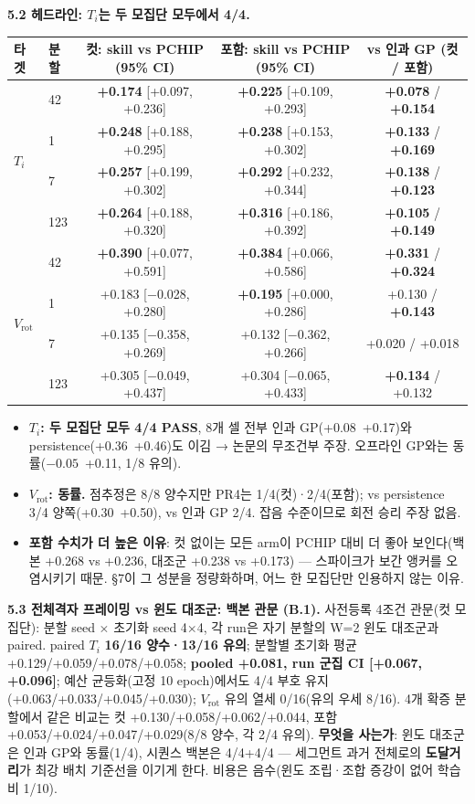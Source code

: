 \documentclass[10pt,a4paper]{article}
\newcommand{\Ti}{\ensuremath{T_i}}
\newcommand{\Vrot}{\ensuremath{V_\mathrm{rot}}}
\newcommand{\pass}[1]{\textbf{#1}}
\begin{document}
\textbf{5.2 헤드라인: \Ti{}는 두 모집단 모두에서 4/4.}
\begin{center}\small
\begin{tabular}{llccc}\toprule
타겟 & 분할 & 컷: skill vs PCHIP (95\% CI) & 포함: skill vs PCHIP (95\% CI) & vs 인과 GP (컷 / 포함) \\ \midrule
\multirow{4}{*}{\Ti}
 & 42 & \pass{+0.174} [+0.097, +0.236] & \pass{+0.225} [+0.109, +0.293] & \pass{+0.078} / \pass{+0.154} \\
 & 1 & \pass{+0.248} [+0.188, +0.295] & \pass{+0.238} [+0.153, +0.302] & \pass{+0.133} / \pass{+0.169} \\
 & 7 & \pass{+0.257} [+0.199, +0.302] & \pass{+0.292} [+0.232, +0.344] & \pass{+0.138} / \pass{+0.123} \\
 & 123 & \pass{+0.264} [+0.188, +0.320] & \pass{+0.316} [+0.186, +0.392] & \pass{+0.105} / \pass{+0.149} \\ \midrule
\multirow{4}{*}{\Vrot}
 & 42 & \pass{+0.390} [+0.077, +0.591] & \pass{+0.384} [+0.066, +0.586] & \pass{+0.331} / \pass{+0.324} \\
 & 1 & +0.183 [$-$0.028, +0.280] & \pass{+0.195} [+0.000, +0.286] & +0.130 / \pass{+0.143} \\
 & 7 & +0.135 [$-$0.358, +0.269] & +0.132 [$-$0.362, +0.266] & +0.020 / +0.018 \\
 & 123 & +0.305 [$-$0.049, +0.437] & +0.304 [$-$0.065, +0.433] & \pass{+0.134} / +0.132 \\ \bottomrule
\end{tabular}
\end{center}
\begin{itemize}
\item \textbf{\Ti{}: 두 모집단 모두 4/4 PASS}, 8개 셀 전부 인과 GP(+0.08~+0.17)와 persistence(+0.36~+0.46)도 이김 → 논문의 무조건부 주장. 오프라인 GP와는 동률($-0.05$~+0.11, 1/8 유의).
\item \textbf{\Vrot{}: 동률.} 점추정은 8/8 양수지만 PR4는 1/4(컷)·2/4(포함); vs persistence 3/4 양쪽(+0.30~+0.50), vs 인과 GP 2/4. 잡음 수준이므로 회전 승리 주장 없음.
\item \textbf{포함 수치가 더 높은 이유}: 컷 없이는 모든 arm이 PCHIP 대비 더 좋아 보인다(백본 +0.268 vs +0.236, 대조군 +0.238 vs +0.173) — 스파이크가 보간 앵커를 오염시키기 때문. \S7이 그 성분을 정량화하며, 어느 한 모집단만 인용하지 않는 이유.
\end{itemize}

\textbf{5.3 전체격자 프레이밍 vs 윈도 대조군: 백본 관문 (B.1).} 사전등록 4조건 관문(컷 모집단): 분할 seed $\times$ 초기화 seed 4$\times$4, 각 run은 자기 분할의 W=2 윈도 대조군과 paired. paired \Ti{} \textbf{16/16 양수·13/16 유의}; 분할별 초기화 평균 +0.129/+0.059/+0.078/+0.058; \textbf{pooled +0.081, run 군집 CI [+0.067, +0.096]}; 예산 균등화(고정 10 epoch)에서도 4/4 부호 유지(+0.063/+0.033/+0.045/+0.030); \Vrot{} 유의 열세 0/16(유의 우세 8/16). 4개 확증 분할에서 같은 비교는 컷 +0.130/+0.058/+0.062/+0.044, 포함 +0.053/+0.024/+0.047/+0.029(8/8 양수, 각 2/4 유의). \textbf{무엇을 사는가}: 윈도 대조군은 인과 GP와 동률(1/4), 시퀀스 백본은 4/4+4/4 — 세그먼트 과거 전체로의 \textbf{도달거리}가 최강 배치 기준선을 이기게 한다. 비용은 음수(윈도 조립·조합 증강이 없어 학습비 1/10).
\end{document}
